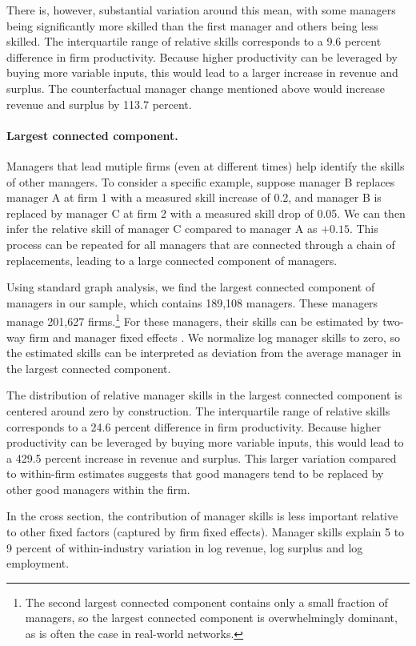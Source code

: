 \documentclass[11pt,a4paper]{article}
\begin{document}
There is, however, substantial variation around this mean, with some managers being significantly more skilled than the first manager and others being less skilled. The interquartile range of relative skills corresponds to a 9.6 percent difference in firm productivity. Because higher productivity can be leveraged by buying more variable inputs, this would lead to a larger increase in revenue and surplus. The counterfactual manager change mentioned above would increase revenue and surplus by 113.7 percent.


\paragraph{Largest connected component.}
Managers that lead mutiple firms (even at different times) help identify the skills of other managers. To consider a specific example, suppose manager B replaces manager A at firm 1 with a measured skill increase of 0.2, and manager B is replaced by manager C at firm 2 with a measured skill drop of 0.05. We can then infer the relative skill of manager C compared to manager A as $+0.15$. This process can be repeated for all managers that are connected through a chain of replacements, leading to a large connected component of managers.

Using standard graph analysis, we find the largest connected component of managers in our sample, which contains 189,108 managers. These managers manage 201,627 firms.\footnote{The second largest connected component contains only a small fraction of managers, so the largest connected component is overwhelmingly dominant, as is often the case in real-world networks.} For these managers, their skills can be estimated by two-way firm and manager fixed effects \citep{Abowd1999Econometrica,reghdfe}. We normalize log manager skills to zero, so the estimated skills can be interpreted as deviation from the average manager in the largest connected component. 

The distribution of relative manager skills in the largest connected component is centered around zero by construction. The interquartile range of relative skills corresponds to a 24.6 percent difference in firm productivity. Because higher productivity can be leveraged by buying more variable inputs, this would lead to a 429.5 percent increase in revenue and surplus. This larger variation compared to within-firm estimates suggests that good managers tend to be replaced by other good managers within the firm. 

In the cross section, the contribution of manager skills is less important relative to other fixed factors (captured by firm fixed effects). Manager skills explain 5 to 9 percent of within-industry variation in log revenue, log surplus and log employment.
\end{document}
